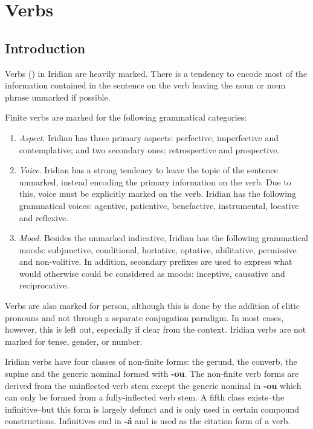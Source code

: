 \chapter{Verbs}
\section{Introduction}
Verbs () in Iridian are heavily marked. There is a tendency to encode most of the information contained in the sentence on the verb leaving the noun or noun phrase unmarked if possible.

\par Finite verbs are marked for the following grammatical categories:
\begin{enumerate}
	\item \textit{Aspect}. Iridian has three primary aspects: perfective, imperfective and contemplative; and two secondary ones: retrospective and prospective.
	\item \textit{Voice}. Iridian has a strong tendency to leave the topic of the sentence unmarked, instead encoding the primary information on the verb. Due to this, voice must be explicitly marked on the verb. Iridian has the following grammatical voices: agentive, patientive, benefactive, instrumental, locative and reflexive.
	\item \textit{Mood}. Besides the unmarked indicative, Iridian has the following grammatical moods: subjunctive, conditional, hortative, optative, abilitative, permissive and non-volitive. In addition, secondary prefixes are used to express what would otherwise could be considered as moods: inceptive, causative and reciprocative.
\end{enumerate}

Verbs are also marked for person, although this is done by the addition of clitic pronouns and not through a separate conjugation paradigm. In most cases, however, this is left out, especially if clear from the context. Iridian verbs are not marked for tense, gender, or number.

\par Iridian verbs have four classes of non-finite forms: the gerund, the converb, the supine and the generic nominal formed with \textbf{-ou}. The non-finite verb forms are derived from the uninflected verb stem except the generic nominal in \textbf{-ou} which can only be formed from a fully-inflected verb stem. A fifth class exists--the infinitive--but this form is largely defunct and is only used in certain compound constructions. Infinitives end in \textbf{-á} and is used as the citation form of a verb.


